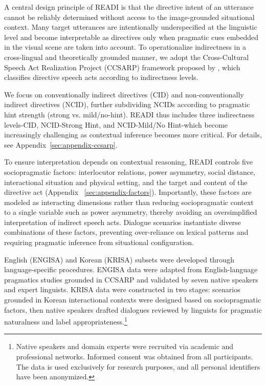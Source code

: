 \documentclass[11pt]{article}
\begin{document}
A central design principle of READI is that the directive intent of an utterance cannot be reliably determined without access to the image-grounded situational context. Many target utterances are intentionally underspecified at the linguistic level and become interpretable as directives only when pragmatic cues embedded in the visual scene are taken into account. To operationalize indirectness in a cross-lingual and theoretically grounded manner, we adopt the Cross-Cultural Speech Act Realization Project (CCSARP) framework proposed by \citet{blum1989investigating}, which classifies directive speech acts according to indirectness levels.

We focus on conventionally indirect directives (CID) and non-conventionally indirect directives (NCID), further subdividing NCIDs according to pragmatic hint strength (strong vs. mild/no-hint). READI thus includes three indirectness levels-CID, NCID-Strong Hint, and NCID-Mild/No Hint-which become increasingly challenging as contextual inference becomes more critical. For details, see Appendix~\ref{sec:appendix-ccsarp}.

To ensure interpretation depends on contextual reasoning, READI controls five sociopragmatic factors: interlocutor relations, power asymmetry, social distance, interactional situation and physical setting, and the target and content of the directive act (Appendix ~\ref{sec:appendix-factors}). Importantly, these factors are modeled as interacting dimensions rather than reducing sociopragmatic context to a single variable such as power asymmetry, thereby avoiding an oversimplified interpretation of indirect speech acts. Dialogue scenarios instantiate diverse combinations of these factors, preventing over-reliance on lexical patterns and requiring pragmatic inference from situational configuration.

English (ENGISA) and Korean (KRISA) subsets were developed through language-specific procedures. ENGISA data were adapted from English-language pragmatics studies grounded in CCSARP and validated by seven native speakers and expert linguists. KRISA data were constructed in two stages: scenarios grounded in Korean interactional contexts were designed based on sociopragmatic factors, then native speakers drafted dialogues reviewed by linguists for pragmatic naturalness and label appropriateness.\footnote{Native speakers and domain experts were recruited via academic and professional networks. Informed consent was obtained from all participants. The data is used exclusively for research purposes, and all personal identifiers have been anonymized.}
\end{document}
